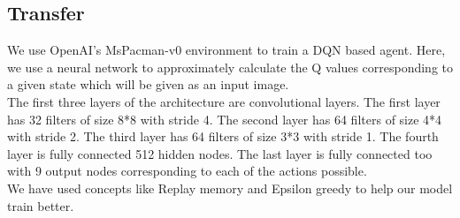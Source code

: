 \documentclass[10pt,twocolumn,letterpaper]{article}
\begin{document}



\subsection{Transfer}
We use OpenAI's MsPacman-v0 environment to train a DQN based agent. Here, we use a neural network to approximately calculate the Q values corresponding to a given state which will be given as an input image.\\
The first three layers of the architecture are convolutional layers. The first layer has 32 filters of size 8*8 with stride 4. The second layer has 64 filters of size 4*4 with stride 2. The third layer has 64 filters of size 3*3 with stride 1. The fourth layer is fully connected 512 hidden nodes. The last layer is fully connected too with 9 output nodes corresponding to each of the actions possible.\\
We have used concepts like Replay memory and Epsilon greedy to help our model train better.
\end{document}
